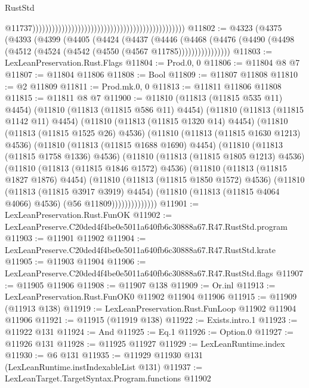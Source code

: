 \begin{lexlean}{RustStd}
\begin{coremodule}
                                                                                                  @11737)))))))))))))))))))))))))))))))))))))))))))))))
@11802 := @4323
    (@4375
      (@4393
        (@4399
          (@4405
            (@4424
              (@4437
                (@4446
                  (@4468
                    (@4476 (@4490 (@4498 (@4512 (@4524 (@4542 (@4550 (@4567 @11785))))))))))))))))
@11803 := LexLeanPreservation.Rust.Flags
@11804 := Prod.{0, 0}
@11806 := @11804 @8 @7
@11807 := @11804 @11806
@11808 := Bool
@11809 := @11807 @11808
@11810 := @2 @11809
@11811 := Prod.mk.{0, 0}
@11813 := @11811 @11806 @11808
@11815 := @11811 @8 @7
@11900 := @11810
    (@11813 (@11815 @535 @11) @4454)
    (@11810
      (@11813 (@11815 @586 @11) @4454)
      (@11810
        (@11813 (@11815 @1142 @11) @4454)
        (@11810
          (@11813 (@11815 @1320 @14) @4454)
          (@11810
            (@11813 (@11815 @1525 @26) @4536)
            (@11810
              (@11813 (@11815 @1630 @1213) @4536)
              (@11810
                (@11813 (@11815 @1688 @1690) @4454)
                (@11810
                  (@11813 (@11815 @1758 @1336) @4536)
                  (@11810
                    (@11813 (@11815 @1805 @1213) @4536)
                    (@11810
                      (@11813 (@11815 @1846 @1572) @4536)
                      (@11810
                        (@11813 (@11815 @1827 @1876) @4454)
                        (@11810
                          (@11813 (@11815 @1850 @1572) @4536)
                          (@11810
                            (@11813 (@11815 @3917 @3919) @4454)
                            (@11810 (@11813 (@11815 @4064 @4066) @4536) (@56 @11809))))))))))))))
@11901 := LexLeanPreservation.Rust.FunOK
@11902 := LexLeanPreserve.C20ded4f4be0e5011a640fb6c30888a67.R47.RustStd.program
@11903 := @11901 @11902
@11904 := LexLeanPreserve.C20ded4f4be0e5011a640fb6c30888a67.R47.RustStd.krate
@11905 := @11903 @11904
@11906 := LexLeanPreserve.C20ded4f4be0e5011a640fb6c30888a67.R47.RustStd.flags
@11907 := @11905 @11906
@11908 := @11907 @138
@11909 := Or.inl
@11913 := LexLeanPreservation.Rust.FunOK0 @11902 @11904 @11906
@11915 := @11909 (@11913 @138)
@11919 := LexLeanPreservation.Rust.FunLoop @11902 @11904 @11906
@11921 := @11915 (@11919 @138)
@11922 := Exists.intro.{1}
@11923 := @11922 @131
@11924 := And
@11925 := Eq.{1}
@11926 := Option.{0}
@11927 := @11926 @131
@11928 := @11925 @11927
@11929 := LexLeanRuntime.index
@11930 := @6 @131
@11935 := @11929 @11930 @131 (LexLeanRuntime.instIndexableList @131)
@11937 := LexLeanTarget.TargetSyntax.Program.functions @11902

\end{coremodule}
\end{lexlean}

